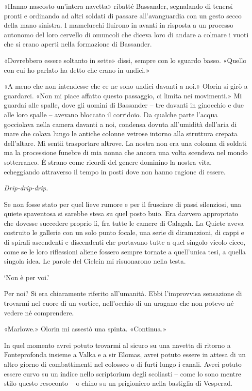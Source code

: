 «Hanno nascosto un'intera navetta» ribatté Bassander, segnalando di
tenersi pronti e ordinando ad altri soldati di passare all'avanguardia
con un gesto secco della mano sinistra. I mamelucchi fluirono in avanti
in risposta a un processo autonomo del loro cervello di omuncoli che
diceva loro di andare a colmare i vuoti che si erano aperti nella
formazione di Bassander.

«Dovrebbero essere soltanto in sette» dissi, sempre con lo sguardo
basso. «Quello con cui ho parlato ha detto che erano in undici.»

«A meno che non intendesse che ce ne sono undici davanti a noi.» Olorin
si girò a guardarci. «Non mi piace affatto questo passaggio, ci limita
nei movimenti.» Mi guardai alle spalle, dove gli uomini di Bassander --
tre davanti in ginocchio e due alle loro spalle -- avevano bloccato il
corridoio. Da qualche parte l'acqua gocciolava nella camera davanti a
noi, condensa dovuta all'umidità dell'aria di mare che colava lungo le
antiche colonne vetrose intorno alla struttura crepata dell'altare. Mi
sentii trasportare altrove. La nostra non era una colonna di soldati ma
la processione funebre di mia nonna che ancora una volta scendeva nel
mondo sotterraneo. È strano come ricordi del genere dominino la nostra
vita, echeggiando attraverso il tempo in posti dove non hanno ragione di
essere.

\emph{Drip-drip-drip}.

Se non fosse stato per quel lieve rumore e per il frusciare di passi
silenziosi, una quiete spaventosa si sarebbe stesa su quel posto buio.
Era davvero appropriato che dovesse succedere proprio lì, fra tutte le
camere di Calagah. La Quiete aveva costruito le gallerie con un solo
punto focale, una serie di diramazioni, di cappi e di spirali ascendenti
e discendenti che portavano tutte a quel singolo vicolo cieco, come se
le loro riflessioni aliene fossero sempre tornate a quell'unica tesi, a
quella singola idea. Le parole del Cielcin mi risuonarono nella testa.

`Non è per voi.'

Per noi? Si era chiaramente riferito all'umanità. Ebbi l'improvvisa
sensazione di trovarmi nel cuore di un vortice, nell'occhio di un
uragano che non potevo né vedere né comprendere.

«Marlowe.» Olorin mi assestò una spinta. «Continua.»

In quel momento avrei potuto trovarmi al sicuro su una navetta di
ritorno a Fonteprofonda insieme a Valka e a sir Elomas, avrei potuto
essere in attesa di un altro giorno di combattimenti nel colosseo o di
furti lungo i canali. Avrei potuto essere curvo su un indice nello
scriptorium degli scoliasti -- come lo sono mentre stilo questo
resoconto -- o chino su un prigioniero nella bastiglia di Vesperad.

